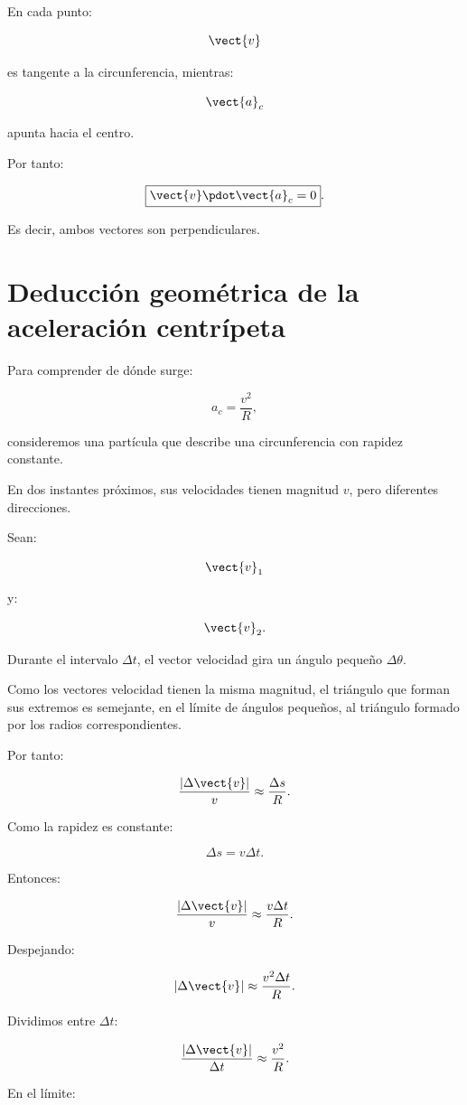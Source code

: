 En cada punto:

\[
\vect{v}
\]

es tangente a la circunferencia, mientras:

\[
\vect{a}_c
\]

apunta hacia el centro.

Por tanto:

\[
\boxed{
\vect{v}\pdot\vect{a}_c=0
}.
\]

Es decir, ambos vectores son perpendiculares.


\section{Deducción geométrica de la aceleración centrípeta}

Para comprender de dónde surge:

\[
a_c=\frac{v^2}{R},
\]

consideremos una partícula que describe una circunferencia con rapidez
constante.

En dos instantes próximos, sus velocidades tienen magnitud \(v\), pero
diferentes direcciones.

Sean:

\[
\vect{v}_1
\]

y:

\[
\vect{v}_2.
\]

Durante el intervalo \(\Delta t\), el vector velocidad gira un ángulo pequeño
\(\Delta\theta\).

Como los vectores velocidad tienen la misma magnitud, el triángulo que forman
sus extremos es semejante, en el límite de ángulos pequeños, al triángulo
formado por los radios correspondientes.

Por tanto:

\[
\frac{|\Delta\vect{v}|}{v}
\approx
\frac{\Delta s}{R}.
\]

Como la rapidez es constante:

\[
\Delta s=v\Delta t.
\]

Entonces:

\[
\frac{|\Delta\vect{v}|}{v}
\approx
\frac{v\Delta t}{R}.
\]

Despejando:

\[
|\Delta\vect{v}|
\approx
\frac{v^2\Delta t}{R}.
\]

Dividimos entre \(\Delta t\):

\[
\frac{|\Delta\vect{v}|}{\Delta t}
\approx
\frac{v^2}{R}.
\]

En el límite:

